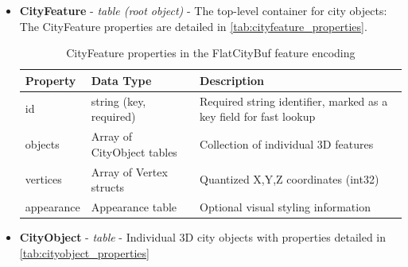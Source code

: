 \begin{itemize}
  \item \textbf{CityFeature} - \textit{table (root object)} - The top-level container for city objects:
    The CityFeature properties are detailed in \autoref{tab:cityfeature_properties}.

    \begin{table}[h]
      \centering
      \caption{CityFeature properties in the FlatCityBuf feature encoding}
      \label{tab:cityfeature_properties}
      \small
      \begin{tabularx}{\textwidth}{@{}llX@{}}
        \toprule
        \textbf{Property} & \textbf{Data Type} & \textbf{Description} \\
        \midrule
        id & string (key, required) & Required string identifier, marked as a key field for fast lookup \\
        objects & Array of CityObject tables & Collection of individual 3D features \\
        vertices & Array of Vertex structs & Quantized X,Y,Z coordinates (int32) \\
        appearance & Appearance table & Optional visual styling information \\
        \bottomrule
      \end{tabularx}
    \end{table}

  \item \textbf{CityObject} - \textit{table} - Individual 3D city objects with properties detailed in \autoref{tab:cityobject_properties}


\end{itemize}
